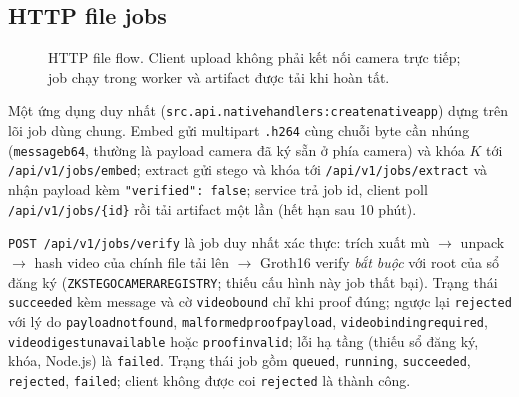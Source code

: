 \documentclass[11pt,a4paper]{article}
\renewcommand{\_}{\origunderscore\allowbreak}
\begin{document}
\subsection{HTTP file jobs}
\begin{figure}[H]\centering
{}
\caption{HTTP file flow. Client upload không phải kết nối camera trực tiếp; job chạy trong worker và artifact được tải khi hoàn tất.}
\label{fig:http-flow}
\end{figure}
Một ứng dụng duy nhất (\texttt{src.api.native\_handlers:create\_native\_app}) dựng trên lõi job dùng chung. Embed gửi multipart \texttt{.h264} cùng chuỗi byte cần nhúng (\texttt{message\_b64}, thường là payload camera đã ký sẵn ở phía camera) và khóa $K$ tới \texttt{/api/v1/jobs/embed}; extract gửi stego và khóa tới \texttt{/api/v1/jobs/extract} và nhận payload kèm \texttt{"verified": false}; service trả job id, client poll \texttt{/api/v1/jobs/\{id\}} rồi tải artifact một lần (hết hạn sau 10 phút).

\texttt{POST /api/v1/jobs/verify} là job duy nhất xác thực: trích xuất mù $\rightarrow$ unpack $\rightarrow$ hash video của chính file tải lên $\rightarrow$ Groth16 verify \emph{bắt buộc} với root của sổ đăng ký (\texttt{ZK\_STEGO\_CAMERA\_REGISTRY}; thiếu cấu hình này job thất bại). Trạng thái \texttt{succeeded} kèm message và cờ \texttt{video\_bound} chỉ khi proof đúng; ngược lại \texttt{rejected} với lý do \texttt{payload\_not\_found}, \texttt{malformed\_proof\_payload}, \texttt{video\_binding\_required}, \texttt{video\_digest\_unavailable} hoặc \texttt{proof\_invalid}; lỗi hạ tầng (thiếu sổ đăng ký, khóa, Node.js) là \texttt{failed}. Trạng thái job gồm \texttt{queued}, \texttt{running}, \texttt{succeeded}, \texttt{rejected}, \texttt{failed}; client không được coi \texttt{rejected} là thành công.
\end{document}
